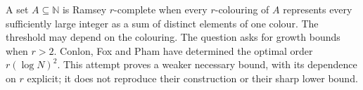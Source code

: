 A set $A\subseteq\mathbb N$ is Ramsey $r$-complete when every $r$-colouring of $A$ represents every sufficiently large integer as a sum of distinct elements of one colour. The threshold may depend on the colouring. The question asks for growth bounds when $r>2$. Conlon, Fox and Pham have determined the optimal order $r(\log N)^2$. This attempt proves a weaker necessary bound, with its dependence on $r$ explicit; it does not reproduce their construction or their sharp lower bound.
